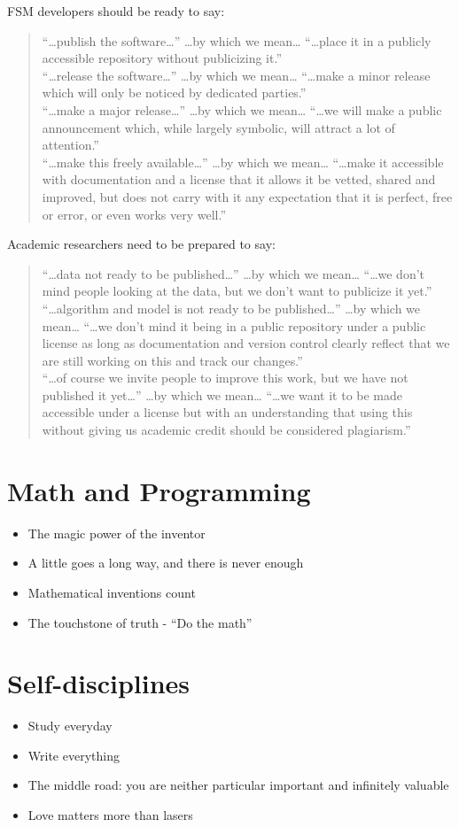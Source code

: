 \documentclass[
	fontsize=10pt, %
	twoside=false, %
	secnumdepth=1, %
]{kaobook}
\begin{document}
FSM developers should be ready to say:
\blockquote{
“…publish the software…” …by which we mean… “…place it in a publicly accessible repository without publicizing it.” \\
“…release the software…” …by which we mean… “…make a minor release which will only be noticed by dedicated parties.” \\
“…make a major release…” …by which we mean… “…we will make a public announcement which, while largely symbolic, will attract a lot of attention.” \\
“…make this freely available…” …by which we mean… “…make it accessible with documentation and a license that it allows it be vetted, shared and improved, but does not carry with it any expectation that it is perfect, free or error, or even works very well.”
}
Academic researchers need to be prepared to say:
\blockquote{
“…data not ready to be published…” …by which we mean… “…we don’t mind people looking at the data, but we don’t want to publicize it yet.” \\
“…algorithm and model is not ready to be published…” …by which we mean… “…we don’t mind it being in a public repository under a public license as long as documentation and version control clearly reflect that we are still working on this and track our changes.” \\
  “…of course we invite people to improve this work, but we have not published it yet…” …by which we mean… “…we want it to be made accessible under a license but with an understanding that using this without giving us academic credit should be considered plagiarism.” \\
  }

\chapter{Math and Programming}

\begin{itemize}
\item The magic power of the inventor
\item A little goes a long way, and there is never enough
\item Mathematical inventions count
  \item The touchstone of truth - ``Do the math''
\end{itemize}

\chapter{Self-disciplines}
\begin{itemize}
\item Study everyday
\item Write everything
\item The middle road: you are neither particular important and infinitely valuable
  \item Love matters more than lasers
  \end{itemize}
\end{document}
